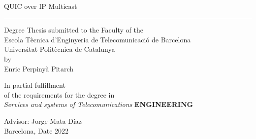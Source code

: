 {
        \fancyhf{}\renewcommand{\headrulewidth}{0pt}
    }

    \thispagestyle{empty}
    \begin{center}
    {\sffamily 
    \\
    \vspace{1cm}
    {\Huge QUIC over IP Multicast}\\
    \vspace{0.5cm}
    {\color{black}\hrule height 1pt}
    \vspace{1cm}
    {
        \large{Degree Thesis submitted to the Faculty of the\\
            Escola T\`ecnica d'Enginyeria de Telecomunicaci\'o de Barcelona \\
            Universitat Polit\`ecnica de Catalunya \\
            by\\
            \vspace{0.5cm} {\Huge{Enric Perpinyà Pitarch}}
        }
    }

    \vspace{1.5cm}

    {In partial fulfillment\\
    of the requirements for the degree in\\
    \textit{Services and systems of Telecomunications} \textbf{ENGINEERING}}

    \vspace{2cm}

    {Advisor: Jorge Mata Díaz\\}
    {Barcelona, Date 2022}

    \vspace{2cm}

    \thispagestyle{alim}
}

\end{center}
